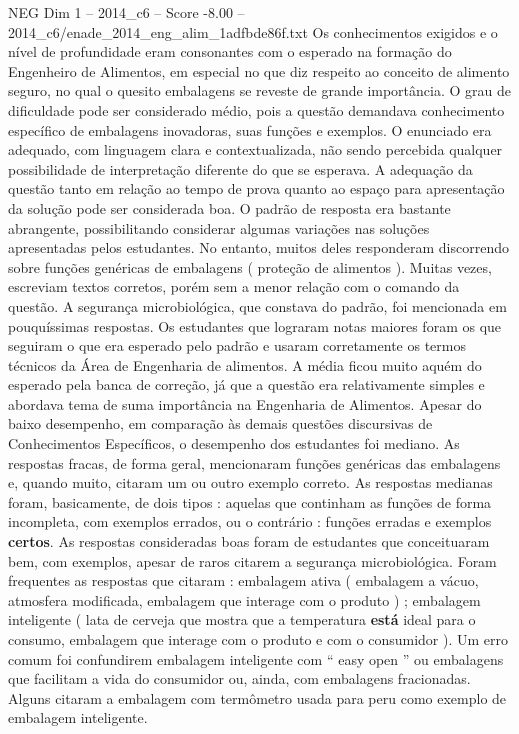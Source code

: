 \begin{textsample}{NEG Dim 1 – 2014\_c6 – Score -8.00 – 2014\_c6/enade\_2014\_eng\_alim\_1adfbde86f.txt}
Os conhecimentos exigidos e o nível de profundidade eram consonantes com o esperado na formação do Engenheiro de Alimentos, em especial no que diz respeito ao conceito de alimento seguro, no qual o quesito embalagens se reveste de grande importância.
O grau de dificuldade pode ser considerado médio, pois a questão demandava conhecimento específico de embalagens inovadoras, suas funções e exemplos.
O enunciado era adequado, com linguagem clara e contextualizada, não sendo percebida qualquer possibilidade de interpretação diferente do que se esperava.
A adequação da questão tanto em relação ao tempo de prova quanto ao espaço para apresentação da solução pode ser considerada boa.
O padrão de resposta era bastante abrangente, possibilitando considerar algumas variações nas soluções apresentadas pelos estudantes.
No entanto, muitos deles responderam discorrendo sobre funções genéricas de embalagens ( proteção de alimentos ).
Muitas vezes, escreviam textos corretos, porém sem a menor relação com o comando da questão.
A segurança microbiológica, que constava do padrão, foi mencionada em pouquíssimas respostas.
Os estudantes que lograram notas maiores foram os que seguiram o que era esperado pelo padrão e usaram corretamente os termos técnicos da Área de Engenharia de alimentos.
A média ficou muito aquém do esperado pela banca de correção, já que a questão era relativamente simples e abordava tema de suma importância na Engenharia de Alimentos.
Apesar do baixo desempenho, em comparação às demais questões discursivas de Conhecimentos Específicos, o desempenho dos estudantes foi mediano.
As respostas fracas, de forma geral, mencionaram funções genéricas das embalagens e, quando muito, citaram um ou outro exemplo correto.
As respostas medianas foram, basicamente, de dois tipos : aquelas que continham as funções de forma incompleta, com exemplos errados, ou o contrário : funções erradas e exemplos \textbf{certos}.
As respostas consideradas boas foram de estudantes que conceituaram bem, com exemplos, apesar de raros citarem a segurança microbiológica.
Foram frequentes as respostas que citaram : embalagem ativa ( embalagem a vácuo, atmosfera modificada, embalagem que interage com o produto ) ; embalagem inteligente ( lata de cerveja que mostra que a temperatura \textbf{está} ideal para o consumo, embalagem que interage com o produto e com o consumidor ).
Um erro comum foi confundirem embalagem inteligente com “ easy open ” ou embalagens que facilitam a vida do consumidor ou, ainda, com embalagens fracionadas.
Alguns citaram a embalagem com termômetro usada para peru como exemplo de embalagem inteligente.

\end{textsample}
